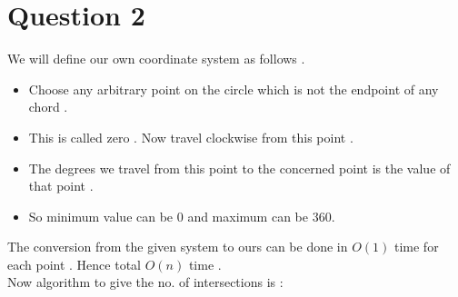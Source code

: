 \documentclass[11pt]{article}
\begin{document}
\section*{Question 2}
We will define our own coordinate system as follows . 
\begin{itemize}
\item Choose any arbitrary point on the circle which is not the endpoint of any chord .
\item This is called zero . Now travel clockwise from this point .
\item The degrees we travel from this point to the concerned point is the value of that point . 
\item So minimum value can be 0 and maximum can be 360. 
\end{itemize}
The conversion from the given system to ours can be done in $O(1)$ time for each point . Hence total $O(n)$ time .\\
Now algorithm to give the no. of intersections is : \\
\end{document}
